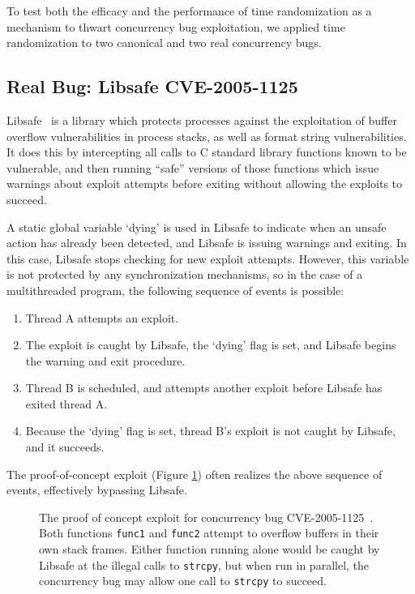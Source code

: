 To test both the efficacy and the performance of time randomization as a mechanism to thwart concurrency bug exploitation, we applied time randomization to two canonical and two real concurrency bugs.
\subsection{Real Bug: Libsafe CVE-2005-1125}
Libsafe~\cite{Tsai2001} is a library which protects processes against the
exploitation of buffer overflow vulnerabilities in process stacks, as well as
format string vulnerabilities.  It does this by intercepting all calls to C
standard library functions known to be vulnerable, and then running ``safe'' versions of those functions which issue warnings about exploit attempts before exiting without allowing the exploits to succeed.

A static global variable `dying' is used in Libsafe to indicate when an unsafe action has already been detected, and Libsafe is issuing warnings and exiting.  In this case, Libsafe stops checking for new exploit attempts.  However, this variable is not protected by any synchronization mechanisms, so in the case of a multithreaded program, the following sequence of events is possible:
\begin{enumerate}
	\item Thread A attempts an exploit.
	\item The exploit is caught by Libsafe, the `dying' flag is set, and Libsafe begins the warning and exit procedure.
	\item Thread B is scheduled, and attempts another exploit before Libsafe has exited thread A.
	\item Because the `dying' flag is set, thread B's exploit is not caught by Libsafe, and it succeeds.
\end{enumerate}
The proof-of-concept exploit (Figure \ref{fig_poc})\cite{Bugtraq13190} often realizes the above sequence of events, effectively bypassing Libsafe.
\begin{figure}
	
	\caption{The proof of concept exploit for concurrency bug CVE-2005-1125~\cite{CVE-2005-1125}.  Both functions \texttt{func1} and \texttt{func2} attempt to overflow buffers in their own stack frames.  Either function running alone would be caught by Libsafe at the illegal calls to \texttt{strcpy}, but when run in parallel, the concurrency bug may allow one call to \texttt{strcpy} to succeed.}
	\label{fig_poc}
\end{figure}

